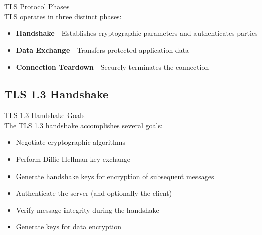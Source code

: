 \begin{definition}{TLS Protocol Phases}\\
TLS operates in three distinct phases:
\begin{itemize}
    \item \textbf{Handshake} - Establishes cryptographic parameters and authenticates parties
    \item \textbf{Data Exchange} - Transfers protected application data
    \item \textbf{Connection Teardown} - Securely terminates the connection
\end{itemize}
\end{definition}

\subsection{TLS 1.3 Handshake}

\begin{concept}{TLS 1.3 Handshake Goals}\\
The TLS 1.3 handshake accomplishes several goals:
\begin{itemize}
    \item Negotiate cryptographic algorithms
    \item Perform Diffie-Hellman key exchange
    \item Generate handshake keys for encryption of subsequent messages
    \item Authenticate the server (and optionally the client)
    \item Verify message integrity during the handshake
    \item Generate keys for data encryption
\end{itemize}
\end{concept}

